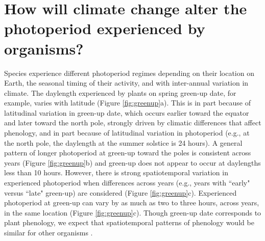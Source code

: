 \documentclass{article}
\begin{document}
\section*{How will climate change alter the photoperiod experienced by organisms?}
\par Species experience different photoperiod regimes depending on their location on Earth, the seasonal timing of their activity, and with inter-annual variation in climate. The daylength experienced by plants on spring green-up date, for example, varies with latitude (Figure \ref{fig:greenup}a). This is in part because of latitudinal variation in green-up date, which occurs earlier toward the equator and later toward the north pole, strongly driven by climatic differences that affect phenology, and in part because of latitudinal variation in photoperiod (e.g., at the north pole, the daylength at the summer solstice is 24 hours). A general pattern of longer photoperiod at green-up toward the poles is consistent across years (Figure \ref{fig:greenup}b) and green-up does not appear to occur at daylengths less than 10 hours. However, there is strong spatiotemporal variation in experienced photoperiod when differences across years (e.g., years with ``early" versus ``late" green-up) are considered (Figure \ref{fig:greenup}c). Experienced photoperiod at green-up can vary by as much as two to three hours, across years, in the same location (Figure \ref{fig:greenup}c). Though green-up date corresponds to plant phenology, we expect that spatiotemporal patterns of phenology would be similar for other organisms \citep{ovaskainen2013, penuelas2002}.
\end{document}
